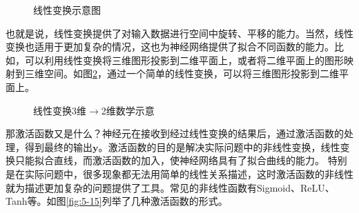 \begin{figure}[htp]
\centering

\caption{线性变换示意图}
\label{fig:5-13}
\end{figure}

\parinterval 也就是说，线性变换提供了对输入数据进行空间中旋转、平移的能力。当然，线性变换也适用于更加复杂的情况，这也为神经网络提供了拟合不同函数的能力。比如，可以利用线性变换将三维图形投影到二维平面上，或者将二维平面上的图形映射到三维空间。如图\ref{fig:5-14}，通过一个简单的线性变换，可以将三维图形投影到二维平面上。

\vspace{-0.5em}
\begin{figure}[htp]
\centering

\caption{线性变换3维$ \rightarrow $2维数学示意}
\label{fig:5-14}
\end{figure}

\vspace{-0.5em}
\parinterval 那激活函数又是什么？神经元在接收到经过线性变换的结果后，通过激活函数的处理，得到最终的输出$ \mathbf y $。激活函数的目的是解决实际问题中的非线性变换，线性变换只能拟合直线，而激活函数的加入，使神经网络具有了拟合曲线的能力。 特别是在实际问题中，很多现象都无法用简单的线性关系描述，这时激活函数的非线性就为描述更加复杂的问题提供了工具。常见的非线性函数有Sigmoid、ReLU、Tanh等。如图\ref{fig:5-15}列举了几种激活函数的形式。\\

